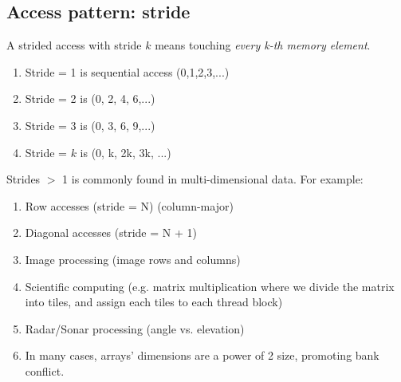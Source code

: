 

\subsection{Access pattern: stride}
\label{sec:access-patt-stride}

A strided access with stride $k$ means touching
{\it every k-th memory element}.
\begin{enumerate}
\item Stride = 1 is sequential access (0,1,2,3,...)
\item Stride = 2 is (0, 2, 4, 6,...)
\item Stride = 3 is (0, 3, 6, 9,...)
\item Stride = $k$ is (0, k, 2k, 3k, ...)
\end{enumerate}

Strides $>$ 1 is commonly found in multi-dimensional data. For
example:
\begin{enumerate}
\item Row accesses (stride = N) (column-major)
\item Diagonal accesses (stride = N + 1)
\item Image processing (image rows and columns)
\item Scientific computing (e.g. matrix multiplication where we divide
  the matrix into tiles, and assign each tiles to each thread block)
\item Radar/Sonar processing (angle vs. elevation)
\item In many cases, arrays' dimensions are a power of 2 size,
  promoting bank conflict. 
\end{enumerate}

